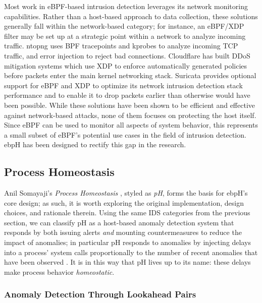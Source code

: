 \documentclass[
  12pt]{findlay}
\begin{document}
Most work in eBPF-based intrusion detection leverages its network
monitoring capabilities. Rather than a host-based approach to data
collection, these solutions generally fall within the network-based
category; for instance, an eBPF/XDP filter may be set up at a strategic
point within a network to analyze incoming traffic. ntopng
\autocite{deri19} uses BPF tracepoints and kprobes to analyze incoming
TCP traffic, and error injection to reject bad connections. Cloudflare
has built DDoS mitigation systems \autocite{bertin17,fabre18} which use
XDP \autocite{hoiland18} to enforce automatically generated policies
before packets enter the main kernel networking stack. Suricata
\autocite{suricata18,yates17} provides optional support for eBPF and XDP
to optimize its network intrusion detection stack performance and to
enable it to drop packets earlier than otherwise would have been
possible. While these solutions have been shown to be efficient and
effective against network-based attacks, none of them focuses on
protecting the host itself. Since eBPF can be used to monitor all
aspects of system behavior, this represents a small subset of eBPF's
potential use cases in the field of intrusion detection. ebpH has been
designed to rectify this gap in the research.

\hypertarget{process-homeostasis}{%
\subsection{Process Homeostasis}\label{process-homeostasis}}

Anil Somayaji's \emph{Process Homeostasis} \autocite{soma02}, styled as
\emph{pH}, forms the basis for ebpH's core design; as such, it is worth
exploring the original implementation, design choices, and rationale
therein. Using the same IDS categories from the previous section, we can
classify pH as a host-based anomaly detection system that responds by
both issuing alerts \emph{and} mounting countermeasures to reduce the
impact of anomalies; in particular pH responds to anomalies by injecting
delays into a process' system calls proportionally to the number of
recent anomalies that have been observed \autocite{soma02}. It is in
this way that pH lives up to its name: these delays make process
behavior \emph{homeostatic}.

\hypertarget{anomaly-detection-through-lookahead-pairs}{%
\subsubsection{Anomaly Detection Through Lookahead
Pairs}\label{anomaly-detection-through-lookahead-pairs}}
\end{document}
